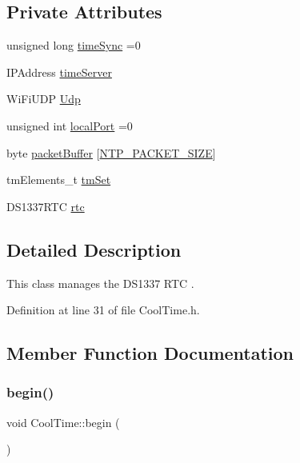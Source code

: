 \subsection*{Private Attributes}
\begin{DoxyCompactItemize}
\item 
unsigned long \hyperlink{classCoolTime_a9d032e76c3470a15b3bbbc52af6463f7}{time\+Sync} =0
\item 
I\+P\+Address \hyperlink{classCoolTime_ad2b9858f399108cb440dd1e908916f04}{time\+Server}
\item 
Wi\+Fi\+U\+DP \hyperlink{classCoolTime_a4e23216a8121ca79d0fb019f30884b92}{Udp}
\item 
unsigned int \hyperlink{classCoolTime_a2f777da44d7ba678be8185299e9b49d1}{local\+Port} =0
\item 
byte \hyperlink{classCoolTime_a27e6abc82a5c2f72161956967005bec7}{packet\+Buffer} \mbox{[}\hyperlink{CoolTime_8h_a56a6ea64006651b4f42adf713e244f06}{N\+T\+P\+\_\+\+P\+A\+C\+K\+E\+T\+\_\+\+S\+I\+ZE}\mbox{]}
\item 
tm\+Elements\+\_\+t \hyperlink{classCoolTime_ad33c2713c903ff064ad09c46406ae088}{tm\+Set}
\item 
D\+S1337\+R\+TC \hyperlink{classCoolTime_abd38f2384ff90692b1568d9db869412e}{rtc}
\end{DoxyCompactItemize}


\subsection{Detailed Description}
This class manages the D\+S1337 R\+TC . 

Definition at line 31 of file Cool\+Time.\+h.



\subsection{Member Function Documentation}
\mbox{\label{classCoolTime_ab1976cf718b950bc31e003c3323b8adb}} 
\subsubsection{\texorpdfstring{begin()}{begin()}}
{\footnotesize\ttfamily void Cool\+Time\+::begin (\begin{DoxyParamCaption}{ }\end{DoxyParamCaption})}


